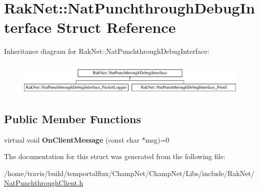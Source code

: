 \hypertarget{struct_rak_net_1_1_nat_punchthrough_debug_interface}{\section{Rak\-Net\-:\-:Nat\-Punchthrough\-Debug\-Interface Struct Reference}
\label{struct_rak_net_1_1_nat_punchthrough_debug_interface}
}
Inheritance diagram for Rak\-Net\-:\-:Nat\-Punchthrough\-Debug\-Interface\-:\begin{figure}[H]
\begin{center}
\leavevmode
\includegraphics[height=1.666667cm]{struct_rak_net_1_1_nat_punchthrough_debug_interface}
\end{center}
\end{figure}
\subsection*{Public Member Functions}
\begin{DoxyCompactItemize}
\item 
\hypertarget{struct_rak_net_1_1_nat_punchthrough_debug_interface_a52b0b9b8815b79359dd3e6d4fafcf7e0}{virtual void {\bfseries On\-Client\-Message} (const char $\ast$msg)=0}\label{struct_rak_net_1_1_nat_punchthrough_debug_interface_a52b0b9b8815b79359dd3e6d4fafcf7e0}

\end{DoxyCompactItemize}


The documentation for this struct was generated from the following file\-:\begin{DoxyCompactItemize}
\item 
/home/travis/build/temportalflux/\-Champ\-Net/\-Champ\-Net/\-Libs/include/\-Rak\-Net/\hyperlink{_nat_punchthrough_client_8h}{Nat\-Punchthrough\-Client.\-h}\end{DoxyCompactItemize}

